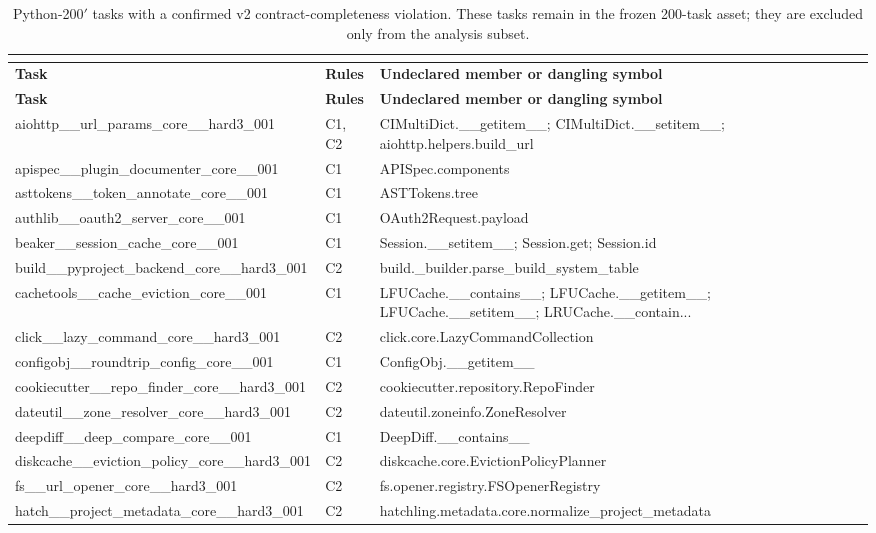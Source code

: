 \begin{longtable}{llp{}}
\caption{Python-200$'$ tasks with a confirmed v2 contract-completeness violation. These tasks remain in the frozen 200-task asset; they are excluded only from the analysis subset.} \\
\label{tab:violators} \\
\toprule
\textbf{Task} & \textbf{Rules} & \textbf{Undeclared member or dangling symbol} \\
\midrule
\endfirsthead
\toprule
\textbf{Task} & \textbf{Rules} & \textbf{Undeclared member or dangling symbol} \\
\midrule
\endhead
aiohttp\_\_url\_params\_core\_\_hard3\_001 & C1, C2 & CIMultiDict.\_\_getitem\_\_; CIMultiDict.\_\_setitem\_\_; aiohttp.helpers.build\_url \\
apispec\_\_plugin\_documenter\_core\_\_001 & C1 & APISpec.components \\
asttokens\_\_token\_annotate\_core\_\_001 & C1 & ASTTokens.tree \\
authlib\_\_oauth2\_server\_core\_\_001 & C1 & OAuth2Request.payload \\
beaker\_\_session\_cache\_core\_\_001 & C1 & Session.\_\_setitem\_\_; Session.get; Session.id \\
build\_\_pyproject\_backend\_core\_\_hard3\_001 & C2 & build.\_builder.parse\_build\_system\_table \\
cachetools\_\_cache\_eviction\_core\_\_001 & C1 & LFUCache.\_\_contains\_\_; LFUCache.\_\_getitem\_\_; LFUCache.\_\_setitem\_\_; LRUCache.\_\_contain... \\
click\_\_lazy\_command\_core\_\_hard3\_001 & C2 & click.core.LazyCommandCollection \\
configobj\_\_roundtrip\_config\_core\_\_001 & C1 & ConfigObj.\_\_getitem\_\_ \\
cookiecutter\_\_repo\_finder\_core\_\_hard3\_001 & C2 & cookiecutter.repository.RepoFinder \\
dateutil\_\_zone\_resolver\_core\_\_hard3\_001 & C2 & dateutil.zoneinfo.ZoneResolver \\
deepdiff\_\_deep\_compare\_core\_\_001 & C1 & DeepDiff.\_\_contains\_\_ \\
diskcache\_\_eviction\_policy\_core\_\_hard3\_001 & C2 & diskcache.core.EvictionPolicyPlanner \\
fs\_\_url\_opener\_core\_\_hard3\_001 & C2 & fs.opener.registry.FSOpenerRegistry \\
hatch\_\_project\_metadata\_core\_\_hard3\_001 & C2 & hatchling.metadata.core.normalize\_project\_metadata \\

\end{longtable}
